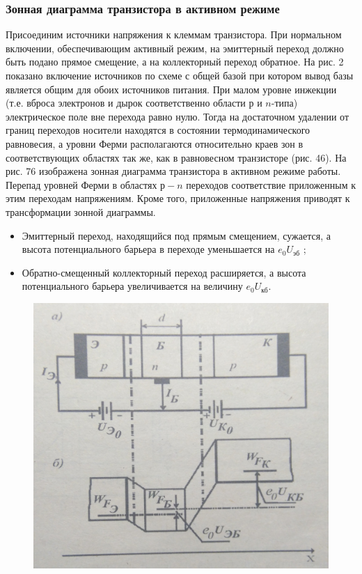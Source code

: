 \subsubsection{Зонная диаграмма транзистора в активном режиме}%
 Присоединим источники напряжения к клеммам транзистора. При
нормальном включении, обеспечивающим активный режим, на эмиттерный
переход должно быть подано прямое смещение, а на коллекторный переход
обратное. На рис. 2 показано включение источников по схеме с общей базой
при котором вывод базы является общим для обоих источников питания. При
малом уровне инжекции (т.е. вброса электронов и дырок соответственно
области $р$ и $n$-типа) электрическое поле вне перехода равно нулю. Тогда
на достаточном удалении от границ переходов носители находятся в состоянии
термодинамического равновесия, а уровни Ферми располагаются относительно
краев зон в соответствующих областях так же, как в равновесном транзисторе
(рис. 46). На рис. 76 изображена зонная диаграмма транзистора в активном
режиме работы.
Перепад уровней Ферми в областях $р-n$ переходов соответствие
приложенным к этим переходам напряжениям. Кроме того, приложенные
напряжения приводят к трансформации зонной диаграммы. 
\begin{itemize}
    \item Эмиттерный переход, находящийся под прямым смещением, сужается, а высота потенциального барьера в переходе уменьшается на $e_{0}U_{\text{эб}}$ ;
    \item Обратно-смещенный коллекторный переход расширяется, а высота потенциального барьера увеличивается на величину $e_0 U_{\text{кб}}$.
\end{itemize}

\begin{figure}[h]
    \centering
    \includegraphics[width=0.5\linewidth]{fig/3.jpg}
    \caption{}
    \label{fig:}
\end{figure}

